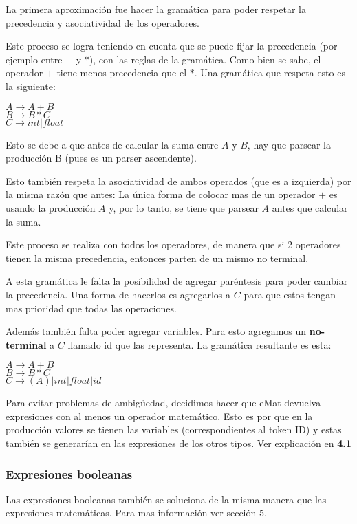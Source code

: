 La primera aproximación fue hacer la gramática para poder respetar la precedencia y asociatividad de los operadores. 

Este proceso se logra teniendo en cuenta que se puede fijar la precedencia (por ejemplo entre $+$ y $*$), con las reglas de la gramática. Como bien se sabe, el operador $+$ tiene menos precedencia que el $*$. Una gramática que respeta esto es la siguiente:

\begin{center}
$A \rightarrow A + B$ \\
$B \rightarrow B * C$ \\
$C \rightarrow int | float$ 
\end{center}
Esto se debe a que antes de calcular la suma entre $A$ y $B$, hay que parsear la producción B (pues es un parser ascendente). 

Esto también respeta la asociatividad de ambos operados (que es a izquierda) por la misma razón que antes: La única forma de colocar mas de un operador $+$ es usando la producción $A$ y, por lo tanto, se tiene que parsear $A$ antes que calcular la suma.

Este proceso se realiza con todos los operadores, de manera que si 2 operadores tienen la misma precedencia, entonces parten de un mismo no terminal.

A esta gramática le falta la posibilidad de agregar paréntesis para poder cambiar la precedencia. Una forma de hacerlos es agregarlos a $C$ para que estos tengan mas prioridad que todas las operaciones.

Además también falta poder agregar variables. Para esto agregamos un \textbf{no-terminal} a $C$ llamado id que las representa. La gramática resultante es esta:
\begin{center}
$A \rightarrow A + B$ \\
$B \rightarrow B * C$ \\
$C \rightarrow (A) | int | float | id$ 
\end{center}

Para evitar problemas de ambigüedad, decidimos hacer que eMat devuelva expresiones con al menos un operador matemático. Esto es por que en la producción valores se tienen las variables (correspondientes al token ID) y estas
también se generarían en las expresiones de los otros tipos. Ver explicación en \textbf{4.1}

\subsubsection{Expresiones booleanas}
Las expresiones booleanas también se soluciona de la misma manera que las expresiones matemáticas. Para mas información ver sección 5.

